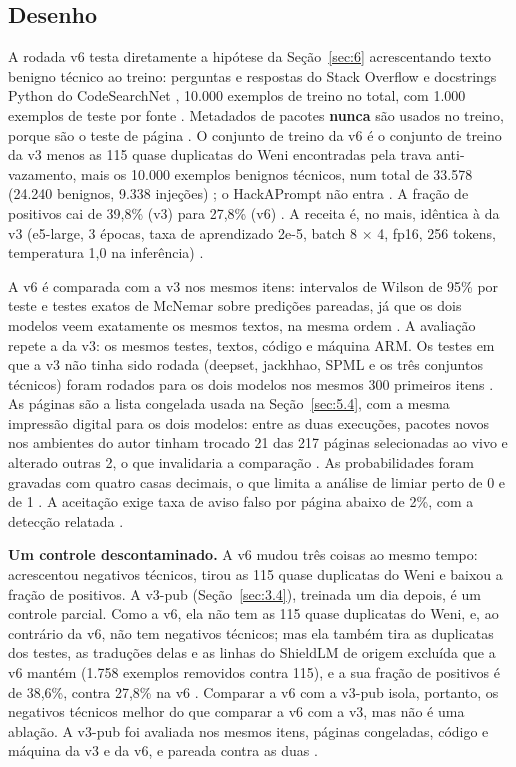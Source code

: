\documentclass[11pt]{article}
\begin{document}
\subsection{Desenho}\label{sec:7.1}

A rodada v6 testa diretamente a hipótese da Seção~\ref{sec:6} acrescentando texto benigno técnico ao treino: perguntas e respostas do Stack Overflow \citep{pacovaldez2022soquestions, koutch2023sopython} e docstrings Python do CodeSearchNet \citep{husain2019codesearchnet, nando2023codesearchnetpython}, 10.000 exemplos de treino no total, com 1.000 exemplos de teste por fonte%
. Metadados de pacotes \textbf{nunca} são usados no treino, porque são o teste de página%
. O conjunto de treino da v6 é o conjunto de treino da v3 menos as 115 quase duplicatas do Weni encontradas pela trava anti-vazamento, mais os 10.000 exemplos benignos técnicos, num total de 33.578 (24.240 benignos, 9.338 injeções)%
; o HackAPrompt não entra%
. A fração de positivos cai de 39,8\% (v3) para 27,8\% (v6)%
. A receita é, no mais, idêntica à da v3 (e5-large, 3 épocas, taxa de aprendizado 2e-5, batch 8 \ensuremath{\times} 4, fp16, 256 tokens, temperatura 1,0 na inferência)%
.

A v6 é comparada com a v3 nos mesmos itens: intervalos de Wilson de 95\% por teste e testes exatos de McNemar \citep{mcnemar1947note} sobre predições pareadas, já que os dois modelos veem exatamente os mesmos textos, na mesma ordem%
. A avaliação repete a da v3: os mesmos testes, textos, código e máquina ARM. Os testes em que a v3 não tinha sido rodada (deepset, jackhhao, SPML e os três conjuntos técnicos) foram rodados para os dois modelos nos mesmos 300 primeiros itens%
. As páginas são a lista congelada usada na Seção~\ref{sec:5.4}, com a mesma impressão digital para os dois modelos: entre as duas execuções, pacotes novos nos ambientes do autor tinham trocado 21 das 217 páginas selecionadas ao vivo e alterado outras 2, o que invalidaria a comparação%
. As probabilidades foram gravadas com quatro casas decimais, o que limita a análise de limiar perto de 0 e de 1%
. A aceitação exige taxa de aviso falso por página abaixo de 2\%, com a detecção relatada%
.

\textbf{Um controle descontaminado.} A v6 mudou três coisas ao mesmo tempo: acrescentou negativos técnicos, tirou as 115 quase duplicatas do Weni e baixou a fração de positivos. A v3-pub (Seção~\ref{sec:3.4}), treinada um dia depois, é um controle parcial. Como a v6, ela não tem as 115 quase duplicatas do Weni, e, ao contrário da v6, não tem negativos técnicos; mas ela também tira as duplicatas dos testes, as traduções delas e as linhas do ShieldLM de origem excluída que a v6 mantém (1.758 exemplos removidos contra 115), e a sua fração de positivos é de 38,6\%, contra 27,8\% na v6%
. Comparar a v6 com a v3-pub isola, portanto, os negativos técnicos melhor do que comparar a v6 com a v3, mas não é uma ablação. A v3-pub foi avaliada nos mesmos itens, páginas congeladas, código e máquina da v3 e da v6, e pareada contra as duas%
.
\end{document}
